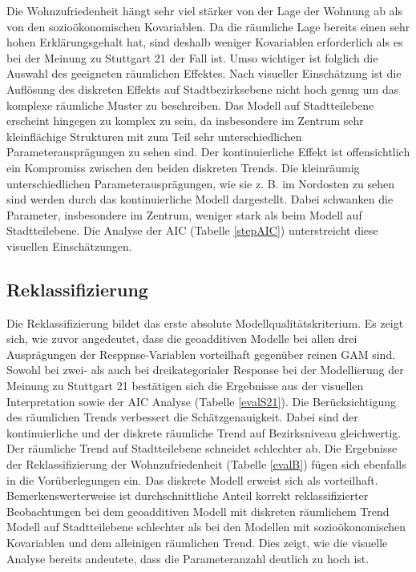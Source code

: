 \documentclass{Vorlage}
\begin{document}
Die Wohnzufriedenheit hängt sehr viel stärker von der Lage der Wohnung ab als von den sozioökonomischen Kovariablen. Da die räumliche Lage bereits einen sehr hohen Erklärungsgehalt hat, sind deshalb weniger Kovariablen erforderlich als es bei der Meinung zu Stuttgart 21 der Fall ist. Umso wichtiger ist folglich die Auswahl des geeigneten räumlichen Effektes. Nach visueller Einschätzung ist die Auflösung des diskreten Effekts auf Stadtbezirksebene nicht hoch genug um das komplexe räumliche Muster zu beschreiben. Das Modell auf Stadtteilebene erscheint hingegen zu komplex zu sein, da insbesondere im Zentrum sehr kleinflächige Strukturen mit zum Teil sehr unterschiedlichen Parameterausprägungen zu sehen sind. Der kontinuierliche Effekt ist offensichtlich ein Kompromiss zwischen den beiden diskreten Trends. Die kleinräumig unterschiedlichen Parameterausprägungen, wie sie z. B. im Nordosten zu sehen sind werden durch das kontinuierliche Modell dargestellt. Dabei schwanken die Parameter, insbesondere im Zentrum, weniger stark als beim Modell auf Stadtteilebene. Die Analyse der AIC (Tabelle \ref{stepAIC}) unterstreicht diese visuellen Einschätzungen.

\subsection{Reklassifizierung}
Die Reklassifizierung bildet das erste absolute Modellqualitätskriterium. Es zeigt sich, wie zuvor angedeutet, dass die geoadditiven Modelle bei allen drei Ausprägungen der Resppnse-Variablen vorteilhaft gegenüber reinen GAM sind. Sowohl bei zwei- als auch bei dreikategorialer Response bei der Modellierung der Meinung zu Stuttgart 21 bestätigen sich die Ergebnisse aus der visuellen Interpretation sowie der AIC Analyse (Tabelle \ref{evalS21}). Die Berücksichtigung des räumlichen Trends verbessert die Schätzgenauigkeit. Dabei sind der kontinuierliche und der diskrete räumliche Trend auf Bezirksniveau gleichwertig. Der räumliche Trend auf Stadtteilebene schneidet schlechter ab. Die Ergebnisse der Reklassifizierung der Wohnzufriedenheit (Tabelle \ref{evalB}) fügen sich ebenfalls in die Vorüberlegungen ein. Das diskrete Modell erweist sich als vorteilhaft. Bemerkenswerterweise ist durchschnittliche Anteil korrekt reklassifizierter Beobachtungen bei dem geoadditiven Modell mit diskreten räumlichem Trend Modell auf Stadtteilebene schlechter als bei den Modellen mit sozioökonomischen Kovariablen und dem alleinigen räumlichen Trend. Dies zeigt, wie die visuelle Analyse bereits andeutete, dass die Parameteranzahl deutlich zu hoch ist.
\end{document}
